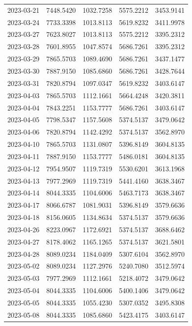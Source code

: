 \begin{footnotesize}
\begin{longtable}{lllll}
2023-03-21 & 7448.5420 & 1032.7258 & 5575.2212 & 3453.9141 \\
2023-03-24 & 7733.3398 & 1013.8113 & 5619.8232 & 3411.9978 \\
2023-03-27 & 7623.8027 & 1013.8113 & 5575.2212 & 3395.2312 \\
2023-03-28 & 7601.8955 & 1047.8574 & 5686.7261 & 3395.2312 \\
2023-03-29 & 7865.5703 & 1089.4690 & 5686.7261 & 3437.1477 \\
2023-03-30 & 7887.9150 & 1085.6860 & 5686.7261 & 3428.7644 \\
2023-03-31 & 7820.8794 & 1097.0347 & 5619.8232 & 3403.6147 \\
2023-04-03 & 7865.5703 & 1112.1661 & 5664.4248 & 3420.3811 \\
2023-04-04 & 7843.2251 & 1153.7777 & 5686.7261 & 3403.6147 \\
2023-04-05 & 7798.5347 & 1157.5608 & 5374.5137 & 3479.0642 \\
2023-04-06 & 7820.8794 & 1142.4292 & 5374.5137 & 3562.8970 \\
2023-04-10 & 7865.5703 & 1131.0807 & 5396.8149 & 3604.8135 \\
2023-04-11 & 7887.9150 & 1153.7777 & 5486.0181 & 3604.8135 \\
2023-04-12 & 7954.9507 & 1119.7319 & 5530.6201 & 3613.1968 \\
2023-04-13 & 7977.2969 & 1119.7319 & 5441.4160 & 3638.3467 \\
2023-04-14 & 8044.3335 & 1104.6006 & 5463.7173 & 3638.3467 \\
2023-04-17 & 8066.6787 & 1081.9031 & 5396.8149 & 3579.6636 \\
2023-04-18 & 8156.0605 & 1134.8634 & 5374.5137 & 3579.6636 \\
2023-04-26 & 8223.0967 & 1172.6921 & 5374.5137 & 3688.6462 \\
2023-04-27 & 8178.4062 & 1165.1265 & 5374.5137 & 3621.5801 \\
2023-04-28 & 8089.0234 & 1184.0409 & 5307.6104 & 3562.8970 \\
2023-05-02 & 8089.0234 & 1127.2976 & 5240.7080 & 3512.5974 \\
2023-05-03 & 7977.2969 & 1112.1661 & 5218.4072 & 3479.0642 \\
2023-05-04 & 8044.3335 & 1104.6006 & 5400.1406 & 3479.0642 \\
2023-05-05 & 8044.3335 & 1055.4230 & 5307.0352 & 3495.8308 \\
2023-05-08 & 8044.3335 & 1085.6860 & 5423.4175 & 3403.6147 \\

\end{longtable}
\end{footnotesize}
